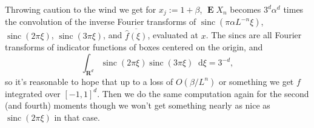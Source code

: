 \documentclass[reqno,10pt]{amsart}
\newcommand{\RR}{\mathbf{R}}
\DeclareMathOperator*{\Expect}{\mathbf E}
\newcommand*\dif{\mathop{}\!\mathrm{d}}
\DeclareMathOperator{\sinc}{sinc}
\theoremstyle{definition}
\numberwithin{equation}{section}
\begin{document}
Throwing caution to the wind we get for $x_j := 1 + \beta$, $\Expect X_n$ becomes $3^d \alpha^d$ times the convolution of the inverse Fourier transforms of $\sinc(\pi \alpha L^{-n} \xi)$, $\sinc(2\pi \xi)$, $\sinc(3\pi \xi)$, and $\overline{\hat f(\xi)}$, evaluated at $x$.
The sincs are all Fourier transforms of indicator functions of boxes centered on the origin, and 
$$\int_{\RR^d} \sinc(2\pi \xi) \sinc(3\pi \xi) \dif \xi = 3^{-d},$$
so it's reasonable to hope that up to a loss of $O(\beta/L^n)$ or something we get $f$ integrated over $[-1, 1]^d$.
Then we do the same computation again for the second (and fourth) moments though we won't get something nearly as nice as $\sinc(2\pi \xi)$ in that case.

\printbibliography
\end{document}

